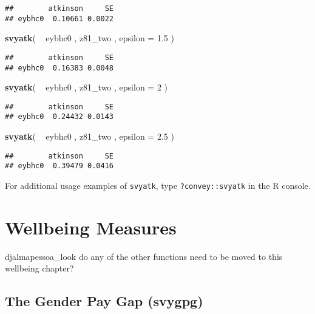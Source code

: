 \documentclass[]{book}
\newenvironment{Shaded}{\begin{snugshade}}{\end{snugshade}}
\newcommand{\KeywordTok}[1]{\textcolor[rgb]{0.13,0.29,0.53}{\textbf{{#1}}}}
\newcommand{\DataTypeTok}[1]{\textcolor[rgb]{0.13,0.29,0.53}{{#1}}}
\newcommand{\DecValTok}[1]{\textcolor[rgb]{0.00,0.00,0.81}{{#1}}}
\newcommand{\FloatTok}[1]{\textcolor[rgb]{0.00,0.00,0.81}{{#1}}}
\newcommand{\StringTok}[1]{\textcolor[rgb]{0.31,0.60,0.02}{{#1}}}
\newcommand{\NormalTok}[1]{{#1}}
\theoremstyle{definition}
\theoremstyle{definition}
\theoremstyle{remark}
\begin{document}
\begin{verbatim}
##        atkinson     SE
## eybhc0  0.10661 0.0022
\end{verbatim}

\begin{Shaded}
\begin{Highlighting}[]
\KeywordTok{svyatk}\NormalTok{( ~}\StringTok{ }\NormalTok{eybhc0 , z81_two , }\DataTypeTok{epsilon =} \FloatTok{1.5} \NormalTok{)}
\end{Highlighting}
\end{Shaded}

\begin{verbatim}
##        atkinson     SE
## eybhc0  0.16383 0.0048
\end{verbatim}

\begin{Shaded}
\begin{Highlighting}[]
\KeywordTok{svyatk}\NormalTok{( ~}\StringTok{ }\NormalTok{eybhc0 , z81_two , }\DataTypeTok{epsilon =} \DecValTok{2} \NormalTok{)}
\end{Highlighting}
\end{Shaded}

\begin{verbatim}
##        atkinson     SE
## eybhc0  0.24432 0.0143
\end{verbatim}

\begin{Shaded}
\begin{Highlighting}[]
\KeywordTok{svyatk}\NormalTok{( ~}\StringTok{ }\NormalTok{eybhc0 , z81_two , }\DataTypeTok{epsilon =} \FloatTok{2.5} \NormalTok{)}
\end{Highlighting}
\end{Shaded}

\begin{verbatim}
##        atkinson     SE
## eybhc0  0.39479 0.0416
\end{verbatim}

For additional usage examples of \texttt{svyatk}, type
\texttt{?convey::svyatk} in the R console.

\chapter{Wellbeing Measures}\label{wellbeing}

djalmapessoa\_look do any of the other functions need to be moved to
this wellbeing chapter?

\section{The Gender Pay Gap (svygpg)}\label{the-gender-pay-gap-svygpg}
\end{document}
